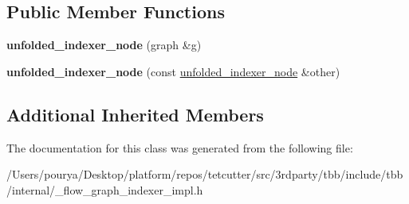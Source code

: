 \subsection*{Public Member Functions}
\begin{DoxyCompactItemize}
\item 
\hypertarget{classinternal_1_1unfolded__indexer__node_a08643dea73fda2b844e06a4605f935ca}{}{\bfseries unfolded\+\_\+indexer\+\_\+node} (graph \&g)\label{classinternal_1_1unfolded__indexer__node_a08643dea73fda2b844e06a4605f935ca}

\item 
\hypertarget{classinternal_1_1unfolded__indexer__node_ae1a7930a8e16698606105ee8e22dedf7}{}{\bfseries unfolded\+\_\+indexer\+\_\+node} (const \hyperlink{classinternal_1_1unfolded__indexer__node}{unfolded\+\_\+indexer\+\_\+node} \&other)\label{classinternal_1_1unfolded__indexer__node_ae1a7930a8e16698606105ee8e22dedf7}

\end{DoxyCompactItemize}
\subsection*{Additional Inherited Members}


The documentation for this class was generated from the following file\+:\begin{DoxyCompactItemize}
\item 
/\+Users/pourya/\+Desktop/platform/repos/tetcutter/src/3rdparty/tbb/include/tbb/internal/\+\_\+flow\+\_\+graph\+\_\+indexer\+\_\+impl.\+h\end{DoxyCompactItemize}
